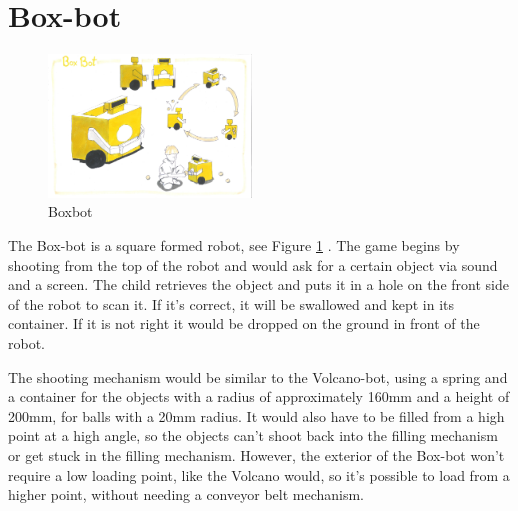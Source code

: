 \documentclass[11pt,twoside,a4paper]{report}
\begin{document}
\section{Box-bot}
\begin{figure}
  \begin{center}
    \includegraphics[width=0.48\textwidth]{Images/BoxBotConcept.pdf}
  \end{center}
  \caption{Boxbot}
  \label{figure:boxbot}
\end{figure}
The Box-bot is a square formed robot, see Figure \ref{figure:boxbot} . The game begins by shooting from the top of the robot and would ask for a certain object via sound and a screen. The child retrieves the object and puts it in a hole on the front side of the robot to scan it. If it's correct, it will be swallowed and kept in its container. If it is not right it would be dropped on the ground in front of the robot.

The shooting mechanism would be similar to the Volcano-bot, using a spring and a container for the objects with a radius of approximately 160mm and a height of 200mm, for balls with a 20mm radius. It would also have to be filled from a high point at a high angle, so the objects can't shoot back into the filling mechanism or get stuck in the filling mechanism. However, the exterior of the Box-bot won't require a low loading point, like the Volcano would, so it's possible to load from a higher point, without needing a conveyor belt mechanism.
\end{document}
